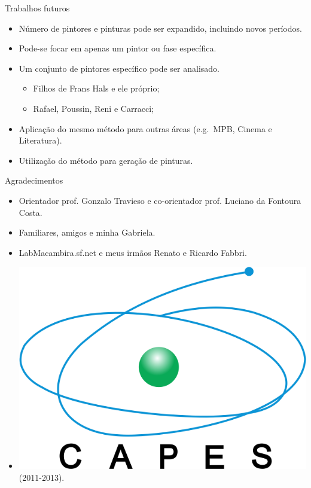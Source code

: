 \documentclass{beamer}
\begin{document}
\begin{frame}{Trabalhos futuros}
  \begin{itemize}
    \item<1> Número de pintores e pinturas pode ser expandido, incluindo novos períodos.

    \item<2> Pode-se focar em apenas um pintor ou fase específica.

    \item<3>{Um conjunto de pintores específico pode ser analisado.
    \begin{itemize}
      \item Filhos de Frans Hals e ele próprio;
      \item Rafael, Poussin, Reni e Carracci;
    \end{itemize}
    }

    \item<4> Aplicação do mesmo método para outras áreas (e.g.\ MPB, Cinema e Literatura).

    \item<5> Utilização do método para geração de pinturas.

  \end{itemize}

\end{frame}

\begin{frame}{Agradecimentos}
  \begin{itemize}
    \item Orientador prof. Gonzalo Travieso e co-orientador prof. Luciano da Fontoura Costa.

    \item Familiares, amigos e minha Gabriela.

    \item LabMacambira.sf.net e meus irmãos Renato e Ricardo Fabbri.

    \item \includegraphics[scale=.3]{figs/logo_capes} (2011-2013).
  \end{itemize}

\end{frame}
\end{document}

